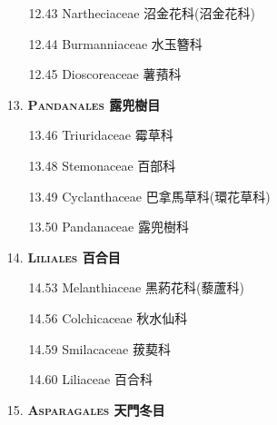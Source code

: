 \begin{enumerate}
    \begin{enumerate}
      \item[12.43] Nartheciaceae 沼金花科(沼金花科)     
        
      \item[12.44] Burmanniaceae 水玉簪科     
        
      \item[12.45] Dioscoreaceae 薯蕷科     
        
    \end{enumerate}
  \item[13. ] \textbf{\textsc{Pandanales} 露兜樹目}   
    \begin{enumerate}
      \item[13.46] Triuridaceae 霉草科     
        
      \item[13.48] Stemonaceae 百部科     
        
      \item[13.49] Cyclanthaceae 巴拿馬草科(環花草科)     
        
      \item[13.50] Pandanaceae 露兜樹科     
        
    \end{enumerate}
  \item[14. ] \textbf{\textsc{Liliales} 百合目}   
    \begin{enumerate}
      \item[14.53] Melanthiaceae 黑葯花科(藜蘆科)     
        
      \item[14.56] Colchicaceae 秋水仙科     
        
      \item[14.59] Smilacaceae 菝葜科     
        
      \item[14.60] Liliaceae 百合科     
        
    \end{enumerate}
  \item[15. ] \textbf{\textsc{Asparagales} 天門冬目}   
    \begin{enumerate}

\end{enumerate}
\end{enumerate}
